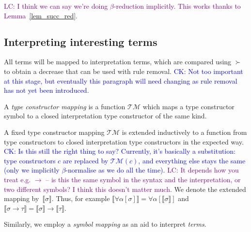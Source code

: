 \documentclass[runningheads,a4paper]{llncs}
\newcommand{\Typemap}{\mathcal{T\!M}}
\newcommand{\quant}[2]{\forall #1[#2]}
\newcommand{\typeinterpret}[1]{\llbracket #1 \rrbracket}
\newcommand{\arrtype}{\rightarrow}
\newcommand{\CK}[1]{\textcolor{blue}{CK: #1}}
\newcommand{\LC}[1]{\textcolor{purple}{LC: #1}}
\begin{document}
\LC{I think we can say we're doing $\beta$-reduction implicitly. This
  works thanks to Lemma~\ref{lem_succ_red}.}

\subsection{Interpreting interesting terms}

All terms will be mapped to interpretation terms, which are compared
using $\succ$ to obtain a decrease that can be used with
rule removal. \CK{Not too important at this stage, but eventually this
paragraph will need changing as rule removal has not yet been
introduced.}

\begin{definition}\normalfont
A \emph{type constructor mapping} is a function $\Typemap$ which maps
a type constructor symbol to a closed interpretation type constructor
of the same kind.

A fixed type constructor mapping $\Typemap$ is extended inductively to
a function from type constructors to closed interpretation type
constructors in the expected way.
\CK{Is this still the right thing to say? Currently, it's basically a
substitution: type constructors $c$ are replaced by $\Typemap(c)$, and
everything else stays the same (only we implicitly $\beta$-normalise as
we do all the time).}
\LC{It depends how you treat e.g. $\to$ -- is this the same symbol in
  the syntax and the interpretation, or two different symbols? I think
  this doesn't matter much.}
We denote the extended mapping
by~$\typeinterpret{\sigma}$. Thus, for example
$\typeinterpret{\quant{\alpha}{\sigma}} =
\quant{\alpha}{\typeinterpret{\sigma}}$ and $\typeinterpret{\sigma
  \arrtype \tau} = \typeinterpret{\sigma} \arrtype
\typeinterpret{\tau}$.
\end{definition}

Similarly, we employ a \emph{symbol mapping} as an aid to interpret
\emph{terms}.
\end{document}
